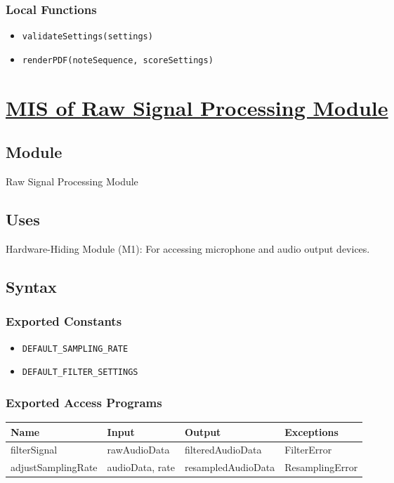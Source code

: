 \documentclass[12pt, titlepage]{article}
\begin{document}
\subsubsection{Local Functions}  
\begin{itemize}  
    \item \texttt{validateSettings(settings)}  
    \item \texttt{renderPDF(noteSequence, scoreSettings)}  
\end{itemize}  

\section{\hyperref[mRSM]{MIS of Raw Signal Processing Module}} \label{M4}  

\subsection{Module}  
Raw Signal Processing Module  

\subsection{Uses}  
Hardware-Hiding Module (M1): For accessing microphone and audio output devices. 

\subsection{Syntax}  

\subsubsection{Exported Constants}  
\begin{itemize}
    \item \texttt{DEFAULT\_SAMPLING\_RATE}  
    \item \texttt{DEFAULT\_FILTER\_SETTINGS}  
\end{itemize}  

\subsubsection{Exported Access Programs}  
\begin{center}  
\begin{tabular}{|p{4cm}|p{3cm}|p{4cm}|p{3.5cm}|}  
\hline  
\textbf{Name} & \textbf{Input} & \textbf{Output} & \textbf{Exceptions} \\  
\hline  
filterSignal & rawAudioData & filteredAudioData & FilterError \\  
adjustSamplingRate & audioData, rate & resampledAudioData & ResamplingError \\  
\hline  
\end{tabular}  
\end{center}  
\end{document}
